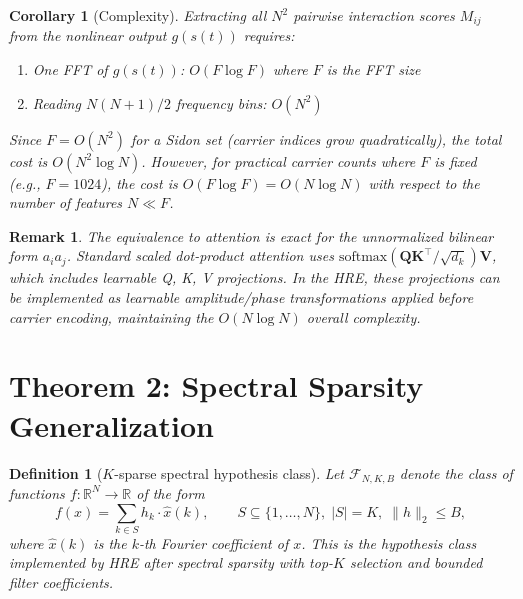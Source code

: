 \documentclass[11pt]{article}
\newtheorem{corollary}[theorem]{Corollary}
\newtheorem{definition}[theorem]{Definition}
\newtheorem{remark}[theorem]{Remark}
\begin{document}
\begin{corollary}[Complexity]
\label{cor:complexity}
Extracting all $N^2$ pairwise interaction scores $M_{ij}$ from the
nonlinear output $g(s(t))$ requires:
\begin{enumerate}
\item One FFT of $g(s(t))$: $O(F \log F)$ where $F$ is the FFT size
\item Reading $N(N+1)/2$ frequency bins: $O(N^2)$
\end{enumerate}
Since $F = O(N^2)$ for a Sidon set (carrier indices grow quadratically),
the total cost is $O(N^2 \log N)$. However, for practical carrier counts
where $F$ is fixed (e.g., $F = 1024$), the cost is $O(F \log F) = O(N \log N)$
with respect to the number of features $N \ll F$.
\end{corollary}

\begin{remark}
The equivalence to attention is exact for the unnormalized bilinear form
$a_i a_j$. Standard scaled dot-product attention uses
$\text{softmax}(\mathbf{Q}\mathbf{K}^\top / \sqrt{d_k})\mathbf{V}$,
which includes learnable Q, K, V projections. In the HRE, these projections
can be implemented as learnable amplitude/phase transformations applied
before carrier encoding, maintaining the $O(N \log N)$ overall complexity.
\end{remark}

\section{Theorem 2: Spectral Sparsity Generalization}

\begin{definition}[$K$-sparse spectral hypothesis class]
Let $\mathcal{F}_{N,K,B}$ denote the class of functions
$f: \mathbb{R}^N \to \mathbb{R}$ of the form
\begin{equation}
f(x) = \sum_{k \in S} h_k \cdot \widehat{x}(k),
\qquad S \subseteq \{1, \ldots, N\},\;|S| = K,\;\|h\|_2 \leq B,
\end{equation}
where $\widehat{x}(k)$ is the $k$-th Fourier coefficient of $x$.
This is the hypothesis class implemented by HRE after spectral sparsity
with top-$K$ selection and bounded filter coefficients.
\end{definition}
\end{document}
